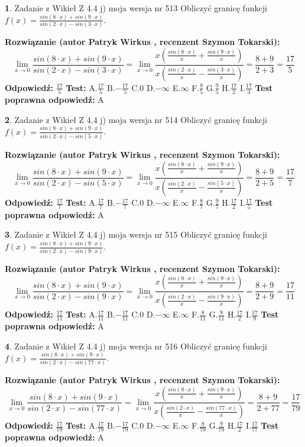\documentclass[12pt, a4paper]{article}
\theoremstyle{definition} %
\newtheorem{zad}{}
\newcommand{\zadStart}[1]{\begin{zad}#1\newline}
\newcommand{\zadStop}{\end{zad}}
\newcommand{\rozwStart}[2]{\noindent \textbf{Rozwiązanie (autor #1 , recenzent #2): }\newline}
\newcommand{\rozwStop}{\newline}
\newcommand{\odpStart}{\noindent \textbf{Odpowiedź:}\newline}
\newcommand{\odpStop}{\newline}
\newcommand{\testStart}{\noindent \textbf{Test:}\newline}
\newcommand{\testStop}{\newline}
\newcommand{\kluczStart}{\noindent \textbf{Test poprawna odpowiedź:}\newline}
\newcommand{\kluczStop}{\newline}
\begin{document}
\zadStart{Zadanie z Wikieł Z 4.4 j) moja wersja nr 513}
Obliczyć granicę funkcji $f(x)=\frac{sin(8\cdot x) +sin(9\cdot x)}{sin(2\cdot x) -sin(3\cdot x)}$.
\zadStop
\rozwStart{Patryk Wirkus}{Szymon Tokarski}
$$\lim\limits_{x\to 0}\frac{sin(8\cdot x) +sin(9\cdot x)}{sin(2\cdot x) -sin(3\cdot x)}=\lim\limits_{x\to 0}\frac{x(\frac{sin(8\cdot x)}{x}+\frac{sin(9\cdot x)}{x})}{x(\frac{sin(2\cdot x)}{x}-\frac{sin(3\cdot x)}{x})}=\frac{8+9}{2+3} = \frac{17}{5}$$
\rozwStop
\odpStart
$\frac{17}{5}$
\odpStop
\testStart
A.$\frac{17}{5}$
B.$-\frac{17}{5}$
C.$0$
D.$-\infty$
E.$\infty$
F.$\frac{8}{5}$
G.$\frac{9}{5}$
H.$\frac{17}{2}$
I.$\frac{17}{3}$
\testStop
\kluczStart
A
\kluczStop



\zadStart{Zadanie z Wikieł Z 4.4 j) moja wersja nr 514}
Obliczyć granicę funkcji $f(x)=\frac{sin(8\cdot x) +sin(9\cdot x)}{sin(2\cdot x) -sin(5\cdot x)}$.
\zadStop
\rozwStart{Patryk Wirkus}{Szymon Tokarski}
$$\lim\limits_{x\to 0}\frac{sin(8\cdot x) +sin(9\cdot x)}{sin(2\cdot x) -sin(5\cdot x)}=\lim\limits_{x\to 0}\frac{x(\frac{sin(8\cdot x)}{x}+\frac{sin(9\cdot x)}{x})}{x(\frac{sin(2\cdot x)}{x}-\frac{sin(5\cdot x)}{x})}=\frac{8+9}{2+5} = \frac{17}{7}$$
\rozwStop
\odpStart
$\frac{17}{7}$
\odpStop
\testStart
A.$\frac{17}{7}$
B.$-\frac{17}{7}$
C.$0$
D.$-\infty$
E.$\infty$
F.$\frac{8}{7}$
G.$\frac{9}{7}$
H.$\frac{17}{2}$
I.$\frac{17}{5}$
\testStop
\kluczStart
A
\kluczStop



\zadStart{Zadanie z Wikieł Z 4.4 j) moja wersja nr 515}
Obliczyć granicę funkcji $f(x)=\frac{sin(8\cdot x) +sin(9\cdot x)}{sin(2\cdot x) -sin(9\cdot x)}$.
\zadStop
\rozwStart{Patryk Wirkus}{Szymon Tokarski}
$$\lim\limits_{x\to 0}\frac{sin(8\cdot x) +sin(9\cdot x)}{sin(2\cdot x) -sin(9\cdot x)}=\lim\limits_{x\to 0}\frac{x(\frac{sin(8\cdot x)}{x}+\frac{sin(9\cdot x)}{x})}{x(\frac{sin(2\cdot x)}{x}-\frac{sin(9\cdot x)}{x})}=\frac{8+9}{2+9} = \frac{17}{11}$$
\rozwStop
\odpStart
$\frac{17}{11}$
\odpStop
\testStart
A.$\frac{17}{11}$
B.$-\frac{17}{11}$
C.$0$
D.$-\infty$
E.$\infty$
F.$\frac{8}{11}$
G.$\frac{9}{11}$
H.$\frac{17}{2}$
I.$\frac{17}{9}$
\testStop
\kluczStart
A
\kluczStop



\zadStart{Zadanie z Wikieł Z 4.4 j) moja wersja nr 516}
Obliczyć granicę funkcji $f(x)=\frac{sin(8\cdot x) +sin(9\cdot x)}{sin(2\cdot x) -sin(77\cdot x)}$.
\zadStop
\rozwStart{Patryk Wirkus}{Szymon Tokarski}
$$\lim\limits_{x\to 0}\frac{sin(8\cdot x) +sin(9\cdot x)}{sin(2\cdot x) -sin(77\cdot x)}=\lim\limits_{x\to 0}\frac{x(\frac{sin(8\cdot x)}{x}+\frac{sin(9\cdot x)}{x})}{x(\frac{sin(2\cdot x)}{x}-\frac{sin(77\cdot x)}{x})}=\frac{8+9}{2+77} = \frac{17}{79}$$
\rozwStop
\odpStart
$\frac{17}{79}$
\odpStop
\testStart
A.$\frac{17}{79}$
B.$-\frac{17}{79}$
C.$0$
D.$-\infty$
E.$\infty$
F.$\frac{8}{79}$
G.$\frac{9}{79}$
H.$\frac{17}{2}$
I.$\frac{17}{77}$
\testStop
\kluczStart
A
\kluczStop
\end{document}
